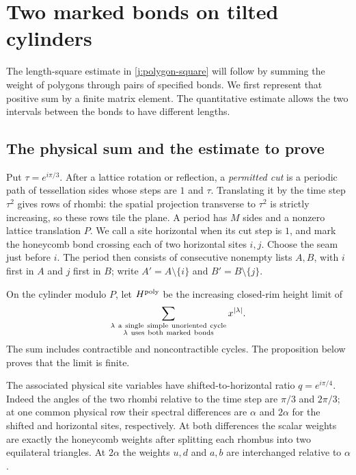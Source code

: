 \section{Two marked bonds on tilted cylinders}\label{c7:marked}

The length-square estimate in \eqref{j:polygon-square} will follow by
summing the weight of polygons through pairs of specified bonds. We
first represent that positive sum by a finite matrix element. The
quantitative estimate allows the two intervals between the bonds to
have different lengths.

\subsection{The physical sum and the estimate to prove}

Put $\tau=e^{i\pi/3}$. After a lattice rotation or reflection, a
\emph{permitted cut} is a periodic path of tessellation sides whose
steps are $1$ and $\tau$. Translating it by the time step $\tau^2$
gives rows of rhombi: the spatial projection transverse to $\tau^2$
is strictly increasing, so these rows tile the plane. A period has
$M$ sides and a nonzero lattice translation $P$. We call a site
horizontal when its cut step is $1$, and mark the honeycomb bond
crossing each of two horizontal sites $i,j$. Choose the seam just
before $i$. The period then consists of consecutive nonempty lists
$A,B$, with $i$ first in $A$ and $j$ first in $B$; write
$A'=A\setminus\{i\}$ and $B'=B\setminus\{j\}$.

On the cylinder modulo $P$, let $H^{\rm poly}$ be the increasing
closed-rim height limit of
\[
 \sum_{\substack{\lambda\ {\rm a\ single\ simple\ unoriented\ cycle}\\
                   \lambda\ {\rm uses\ both\ marked\ bonds}}}
 x^{|\lambda|}.
\]
The sum includes contractible and noncontractible cycles. The
proposition below proves that the limit is finite.

The associated physical site variables have shifted-to-horizontal
ratio $q=e^{i\pi/4}$. Indeed the angles of the two rhombi relative
to the time step are $\pi/3$ and $2\pi/3$; at one common physical
row their spectral differences are $\alpha$ and $2\alpha$ for the
shifted and horizontal sites, respectively. At both differences
the scalar weights are exactly the honeycomb weights after splitting
each rhombus into two equilateral triangles. At $2\alpha$ the
weights $u,d$ and $a,b$ are interchanged relative to $\alpha$.

